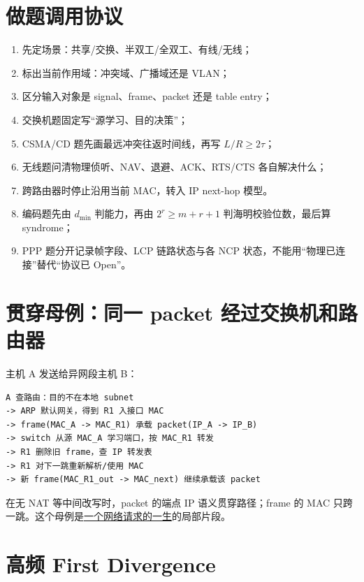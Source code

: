 \documentclass[UTF8,fontset=none,11pt,a4paper]{ctexart}
\providecommand{\tightlist}{\setlength{\itemsep}{0pt}\setlength{\parskip}{0pt}}
\begin{document}
\section{做题调用协议}\label{11-ux505aux9898ux8c03ux7528ux534fux8bae}

\begin{enumerate}
\def\labelenumi{\arabic{enumi}.}
\tightlist
\item
  先定场景：共享/交换、半双工/全双工、有线/无线；
\item
  标出当前作用域：冲突域、广播域还是 VLAN；
\item
  区分输入对象是 signal、frame、packet 还是 table entry；
\item
  交换机题固定写``源学习、目的决策''；
\item
  CSMA/CD 题先画最远冲突往返时间线，再写 \(L/R\ge2\tau\)；
\item
  无线题问清物理侦听、NAV、退避、ACK、RTS/CTS 各自解决什么；
\item
  跨路由器时停止沿用当前 MAC，转入 IP next-hop 模型。
\item
  编码题先由 $d_{\min}$ 判能力，再由 $2^r\ge m+r+1$ 判海明校验位数，最后算 syndrome；
\item
  PPP 题分开记录帧字段、LCP 链路状态与各 NCP 状态，不能用“物理已连接”替代“协议已 Open”。
\end{enumerate}

\section{贯穿母例：同一 packet
经过交换机和路由器}\label{12-ux8d2fux7a7fux6bcdux4f8bux540cux4e00-packet-ux7ecfux8fc7ux4ea4ux6362ux673aux548cux8defux7531ux5668}

主机 A 发送给异网段主机 B：

\begin{lstlisting}
A 查路由：目的不在本地 subnet
-> ARP 默认网关，得到 R1 入接口 MAC
-> frame(MAC_A -> MAC_R1) 承载 packet(IP_A -> IP_B)
-> switch 从源 MAC_A 学习端口，按 MAC_R1 转发
-> R1 删除旧 frame，查 IP 转发表
-> R1 对下一跳重新解析/使用 MAC
-> 新 frame(MAC_R1_out -> MAC_next) 继续承载该 packet
\end{lstlisting}

在无 NAT 等中间改写时，packet 的端点 IP 语义贯穿路径；frame 的 MAC
只跨一跳。这个母例是\href{../60_综合专题/README.md}{一个网络请求的一生}的局部片段。

\section{高频 First
Divergence}\label{13-ux9ad8ux9891-first-divergence}
\end{document}
